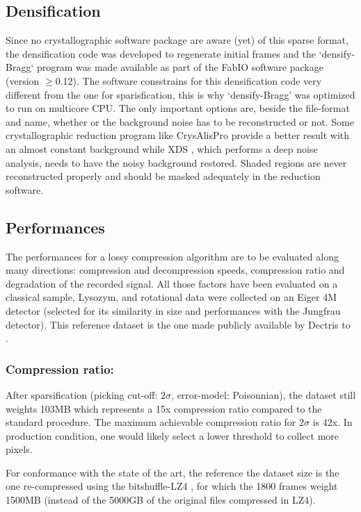 \documentclass[preprint]{iucr}              %
\begin{document}
\subsection{Densification}
Since no crystallographic software package are aware (yet) of this sparse format, the densification code was developed to regenerate initial frames and the `densify-Bragg` program was made available as part of the FabIO \cite{fabio} software package (version $\ge$0.12). 
The software consstrains for this densification code very different from the one for sparisfication, this is why `densify-Bragg' was optimized to run on multicore CPU. 
The only important options are, beside the file-format and name, whether or the background noise has to be reconstructed or not. 
Some crystallographic reduction program like CrysAlisPro \cite{crysalis} provide a better result with an almost constant background while XDS \cite{xds}, which performs a deep noise analysis, needs to have the noisy background restored. 
Shaded regions are never reconstructed properly and should be masked adequately in the reduction software.

\subsection{Performances}
The performances for a lossy compression algorithm are to be evaluated along many directions: compression and decompression speeds, compression ratio and degradation of the recorded signal.
All those factors have been evaluated on a classical sample, Lysozym, and rotational data were collected on an Eiger 4M detector (selected for its similarity in size and performances with the Jungfrau detector). 
This reference dataset is the one made publicly available by Dectris to \cite{lysozym}. 

\subsubsection{Compression ratio:} 
After sparsification (picking cut-off: $2\sigma$, error-model: Poisonnian), the dataset still weights 103MB which represents a 15x compression ratio compared to the standard procedure. 
The maximum achievable compression ratio for $2\sigma$ is 42x. 
In production condition, one would likely select a lower threshold to collect more pixels.

For conformance with the state of the art, the reference the dataset size is the one re-compressed using the bitshuffle-LZ4 \cite{bitshuffle}, for  which the 1800 frames weight 1500MB (instead of the 5000GB of the original files compressed in LZ4).
\end{document}
